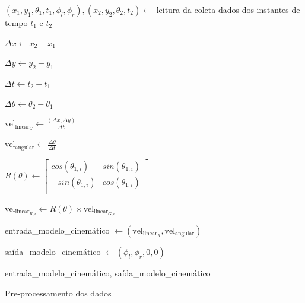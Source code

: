 \begin{algorithm}[H]
    \label{pre:processamento:}
    
    
    $(x_1,y_1,\theta_{1},t_1,\phi_l,\phi_r),(x_2,y_2,\theta_{2},t_2) \leftarrow$ leitura da coleta dados dos instantes de
    tempo $t_1$ e $t_2$

    $\Delta x \leftarrow x_2 - x_1$
    
    $\Delta y \leftarrow y_2 - y_1$

    $\Delta t \leftarrow t_2 - t_1$

    $\Delta \theta \leftarrow \theta_2 - \theta_1$

    \Se {$\Delta \theta > \pi$ }{
                $\Delta \theta \leftarrow \Delta \theta -2\pi $
    }

    \Se {$\Delta \theta < -\pi$ }{
                $\Delta \theta \leftarrow \Delta \theta +2\pi $
    }

    $\text{vel}_{\text{linear}_G} \leftarrow \frac{(\Delta x,\Delta y)}{\Delta t}$

    $\text{vel}_{\text{angular}} \leftarrow \frac{\Delta \theta}{\Delta t}$



     {
       
        $
        R(\theta) \leftarrow 
        \begin{bmatrix}
            cos(\theta_{1,i})  & sin(\theta_{1,i})\\
            -sin(\theta_{1,i}) & cos(\theta_{1,i})\\
        \end{bmatrix}
        $

        $\text{vel}_{\text{linear}_{R,i}} \leftarrow R(\theta) \times \text{vel}_{\text{linear}_{G,i}}$
    }
    
    entrada\_modelo\_cinemático $\leftarrow (\text{vel}_{\text{linear}_{R}},\text{vel}_{\text{angular}})$

    
      {
        saída\_modelo\_cinemático $\leftarrow (\phi_l,\phi_r,0,0)$
      }

   

      \Retorna entrada\_modelo\_cinemático, saída\_modelo\_cinemático
    
    \caption{Pre-processamento dos dados}
    
\end{algorithm}

